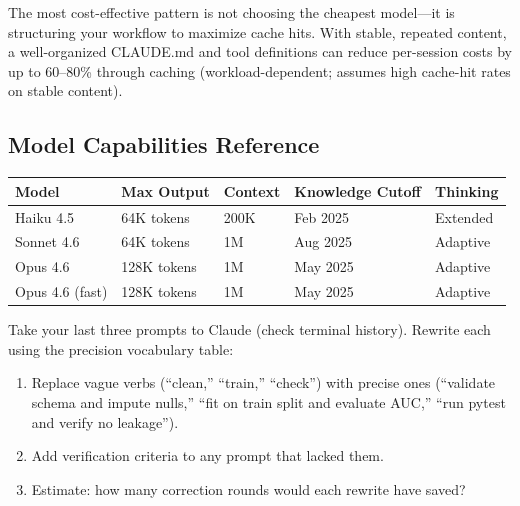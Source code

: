 \begin{keyinsight}
The most cost-effective pattern is not choosing the cheapest model---it is
structuring your workflow to maximize cache hits. With stable, repeated content,
a well-organized CLAUDE.md and tool definitions can reduce per-session costs
by up to 60--80\% through caching (workload-dependent; assumes high
cache-hit rates on stable content).
\end{keyinsight}

\subsection{Model Capabilities Reference}
\label{subsec:model-capabilities}


\begin{fullwidth}
\begin{tabular}{@{}lllll@{}}
\toprule
\textbf{Model} & \textbf{Max Output} & \textbf{Context} & \textbf{Knowledge Cutoff} & \textbf{Thinking} \\
\midrule
Haiku 4.5 & 64K tokens & 200K & Feb 2025 & Extended \\
Sonnet 4.6 & 64K tokens & 1M & Aug 2025 & Adaptive \\
Opus 4.6 & 128K tokens & 1M & May 2025 & Adaptive \\
Opus 4.6 (fast) & 128K tokens & 1M & May 2025 & Adaptive \\
\bottomrule
\end{tabular}
\end{fullwidth}


\begin{trybox}
Take your last three prompts to Claude (check terminal history).
Rewrite each using the precision vocabulary table:
\begin{enumerate}
  \item Replace vague verbs (``clean,'' ``train,'' ``check'')
    with precise ones (``validate schema and impute nulls,''
    ``fit on train split and evaluate AUC,'' ``run pytest and verify no leakage'').
  \item Add verification criteria to any prompt that lacked them.
  \item Estimate: how many correction rounds would each rewrite have saved?
\end{enumerate}
\end{trybox}
